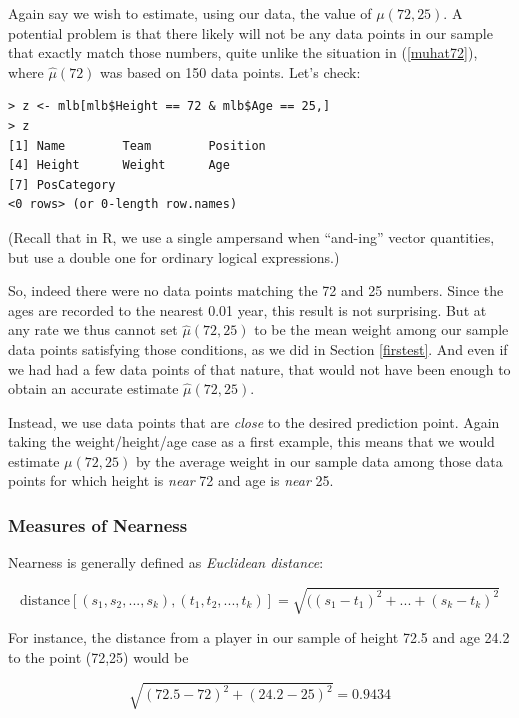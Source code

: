Again say we wish to estimate, using our data, the value of
$\mu(72,25)$.  A potential problem is that there likely will not be any
data points in our sample that exactly match those numbers, quite unlike
the situation in (\ref{muhat72}), where $\widehat{\mu}(72)$ was based on
150 data points.  Let's check:

\begin{lstlisting}
> z <- mlb[mlb$Height == 72 & mlb$Age == 25,]
> z
[1] Name        Team        Position   
[4] Height      Weight      Age        
[7] PosCategory
<0 rows> (or 0-length row.names)
\end{lstlisting}

(Recall that in R, we use a single ampersand when ``and-ing'' vector
quantities, but use a double one for ordinary logical expressions.)

So, indeed there were no data points matching the 72 and 25 numbers.
Since the ages are recorded to the nearest 0.01 year, this result is not
surprising.  But at any rate we thus cannot set $\widehat{\mu}(72,25)$
to be the mean weight among our sample data points satisfying those
conditions, as we did in Section \ref{firstest}.  And even if we had had
a few data points of that nature, that would not have been enough to
obtain an accurate estimate $\widehat{\mu}(72,25)$.

Instead, we use data points that are {\it close} to the
desired prediction point.  Again taking the weight/height/age case as a
first example, this means that we would estimate $\mu(72,25)$ by the
average weight in our sample data among those data points for which
height is {\it near} 72 and age is {\it near} 25.

\subsubsection{Measures of Nearness}
\label{nearness}

Nearness is generally defined as {\it Euclidean distance}:

\begin{equation}
\textrm{distance}[(s_1,s_2,...,s_k),(t_1,t_2,...,t_k)]
= \sqrt{((s_1-t_1)^2+...+(s_k-t_k)^2}
\end{equation}

For instance, the distance from a player in our sample of height 72.5
and age 24.2 to the point (72,25) would be

\begin{equation}
\sqrt{(72.5-72)^2 + (24.2-25)^2} = 0.9434
\end{equation}

